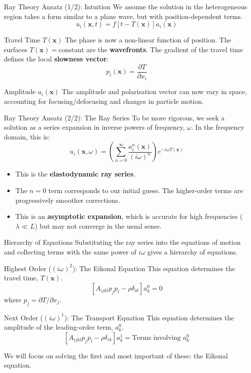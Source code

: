 \documentclass{beamer}
\begin{document}

\begin{frame}{Ray Theory Ansatz (1/2): Intuition}
    We assume the solution in the heterogeneous region takes a form similar to a plane wave, but with position-dependent terms.
    $$ u_{i}(\mathbf{x},t)=f[t-T(\mathbf{x})]a_{i}(\mathbf{x}) $$
    \pause
    \begin{block}{Travel Time $T(\mathbf{x})$}
        The phase is now a non-linear function of position. The surfaces $T(\mathbf{x}) = \text{constant}$ are the \textbf{wavefronts}. The gradient of the travel time defines the local \textbf{slowness vector}:
        $$ p_i(\mathbf{x}) = \frac{\partial T}{\partial x_i} $$
    \end{block}
    \pause
    \begin{block}{Amplitude $a_i(\mathbf{x})$}
        The amplitude and polarisation vector can now vary in space, accounting for focusing/defocusing and changes in particle motion.
    \end{block}
\end{frame}

\begin{frame}{Ray Theory Ansatz (2/2): The Ray Series}
    To be more rigorous, we seek a solution as a series expansion in inverse powers of frequency, $\omega$. In the frequency domain, this is:
    $$ u_{i}(\mathbf{x},\omega)=\left(\sum_{n=0}^{\infty}\frac{a_{i}^{n}(\mathbf{x})}{(i\omega)^{n}}\right)e^{-i\omega T(\mathbf{x})} $$
    \pause
    \begin{itemize}
        \item This is the \textbf{elastodynamic ray series}.
        \pause
        \item The $n=0$ term corresponds to our initial guess. The higher-order terms are progressively smoother corrections.
        \pause
        \item This is an \textbf{asymptotic expansion}, which is accurate for high frequencies ($\lambda \ll L$) but may not converge in the usual sense.
    \end{itemize}
\end{frame}

\begin{frame}{Hierarchy of Equations}
    Substituting the ray series into the equations of motion and collecting terms with the same power of $i\omega$ gives a hierarchy of equations.
    \pause
    \begin{block}{Highest Order ($ (i\omega)^2 $): The Eikonal Equation}
        This equation determines the travel time, $T(\mathbf{x})$.
        $$ [A_{ijkl}p_{j}p_{l}-\rho\delta_{ik}]a_{k}^{0}=0 $$
        where $p_j = \partial T / \partial x_j$.
    \end{block}
    \pause
    \begin{block}{Next Order ($ (i\omega)^1 $): The Transport Equation}
        This equation determines the amplitude of the leading-order term, $a_k^0$.
        $$ [A_{ijkl}p_{j}p_{l}-\rho\delta_{ik}]a_{k}^{1}=\text{Terms involving } a_k^0 $$
    \end{block}
    \pause
    We will focus on solving the first and most important of these: the Eikonal equation.
\end{frame}
\end{document}
